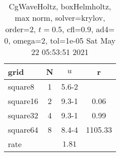 \begin{table}[H]\tableFont %
\begin{center}
\begin{tabular}{|l|c|c|c|} \hline 
grid  & N &  $ u $ & r \\ \hline 
   square8 &     1 & \num{5.6}{-2} &        \\ \hline
  square16 &     2 & \num{9.3}{-1} &  0.06  \\ \hline
  square32 &     4 & \num{9.3}{-1} &  0.99  \\ \hline
  square64 &     8 & \num{8.4}{-4} &1105.33  \\ \hline
    rate             &       &  $1.81$       &       \\ \hline
\end{tabular}
\caption{CgWaveHoltz, boxHelmholtz, max norm, solver=krylov, order=$2$, $t=0.5$, cfl=$0.9$, ad4=$0$, omega=2, tol=1e-05 Sat May 22 05:53:51 2021}\label{table:boxHelmholtzkrylovOrder2max}
\end{center}
\end{table}
